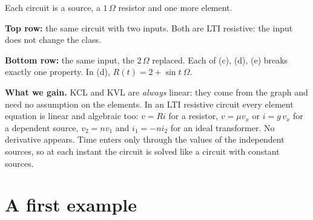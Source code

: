 \documentclass[11pt,a4paper]{article}
\newcommand{\ohm}{\,\Omega}
\begin{document}
\begin{examplebox}
\begin{minipage}[c]{0.6\linewidth}
\end{minipage}\hfill
\begin{minipage}[c]{0.38\linewidth}
\raggedright
Each circuit is a source, a $1\ohm$ resistor and one more element.\par\smallskip
\textbf{Top row:} the same circuit with two inputs. Both are LTI resistive: the input does not
change the class.\par\smallskip
\textbf{Bottom row:} the same input, the $2\ohm$ replaced. Each of (c), (d), (e) breaks exactly
one property. In (d), $R(t) = 2 + \sin t\ \Omega$.
\end{minipage}
\end{examplebox}

\textbf{What we gain.} KCL and KVL are \emph{always} linear: they come from the graph and
need no assumption on the elements. In an LTI resistive circuit every element equation is
linear and algebraic too: $v = Ri$ for a resistor, $v = \mu v_x$ or $i = g\,v_x$
for a dependent source, $v_2 = n v_1$ and $i_1 = -n i_2$ for an ideal transformer. No derivative appears. Time enters only through the values of the
independent sources, so at each instant the circuit is solved like a circuit with constant
sources.


\section{A first example}
\end{document}
